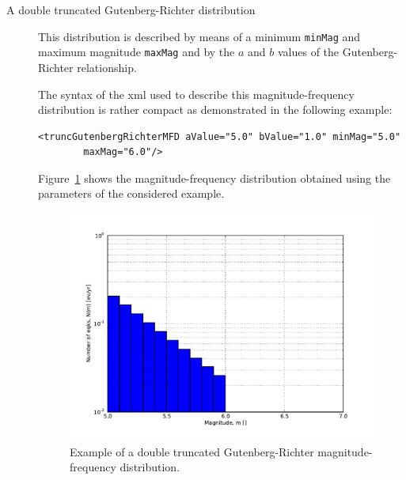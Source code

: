\begin{description}
\item[A double truncated Gutenberg-Richter distribution]

This distribution is described by means of a minimum \texttt{minMag} and
maximum magnitude \texttt{maxMag} and by the $a$ and $b$ values of the
Gutenberg-Richter relationship.

The syntax of the xml used to describe this magnitude-frequency distribution
is rather compact as demonstrated in the following example:

\begin{Verbatim}[frame=single, commandchars=\\\{\}, fontsize=\footnotesize]
<truncGutenbergRichterMFD aValue="5.0" bValue="1.0" minMag="5.0"
        maxMag="6.0"/>
\end{Verbatim}

Figure~\ref{fig:dt_gr_mfd} shows the magnitude-frequency distribution
obtained using the parameters of the considered example.

\begin{figure}[!ht]
\centering
\includegraphics[width=12cm]{figures/hazard/dt_mfd.pdf}
\caption{Example of a double truncated Gutenberg-Richter magnitude-frequency
distribution.}
\label{fig:dt_gr_mfd}
\end{figure}





\end{description}
